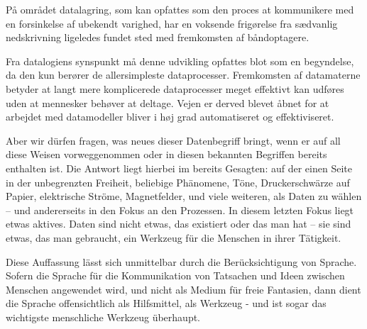 {På området datalagring, som kan opfattes som den proces at kommunikere med en forsinkelse af ubekendt varighed, har en voksende frigørelse fra sædvanlig nedskrivning ligeledes fundet sted med fremkomsten af båndoptagere. 

Fra datalogiens synspunkt må denne udvikling opfattes blot som en begyndelse, da den kun berører de allersimpleste dataprocesser. Fremkomsten af datamaterne betyder at langt mere komplicerede dataprocesser meget effektivt kan udføres uden at mennesker behøver at deltage. Vejen er derved blevet åbnet for at arbejdet med datamodeller bliver i høj grad automatiseret og effektiviseret. 
}{
Aber wir dürfen fragen, was neues dieser Datenbegriff bringt, wenn er auf all diese Weisen vorweggenommen oder in diesen bekannten Begriffen bereits enthalten ist. Die Antwort liegt hierbei im bereits Gesagten: auf der einen Seite in der unbegrenzten Freiheit, beliebige Phänomene, Töne, Druckerschwärze auf Papier, elektrische Ströme, Magnetfelder, und viele weiteren, als Daten zu wählen -- und andererseits in den Fokus an den Prozessen. In diesem letzten Fokus liegt etwas aktives. Daten sind nicht etwas, das existiert oder das man hat -- sie sind etwas, das man gebraucht, ein Werkzeug für die Menschen in ihrer Tätigkeit. 

Diese Auffassung lässt sich unmittelbar durch die Berücksichtigung von Sprache. Sofern die Sprache für die Kommunikation von Tatsachen und Ideen zwischen Menschen angewendet wird, und nicht als Medium für freie Fantasien, dann dient die Sprache offensichtlich als Hilfsmittel, als Werkzeug - und ist sogar das wichtigste menschliche Werkzeug überhaupt. 

}
